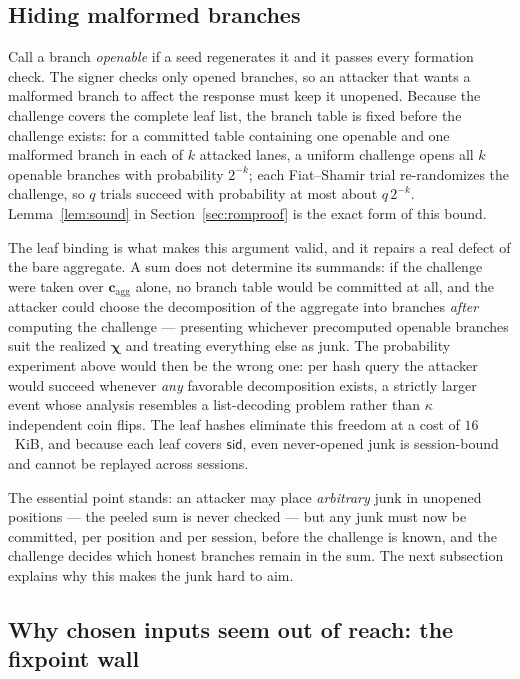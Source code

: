 \documentclass[11pt]{article}
\begin{document}
\subsection{Hiding malformed branches}
\label{sec:hiding}

Call a branch \emph{openable} if a seed regenerates it and it passes every
formation check.  The signer checks only opened branches, so an attacker that
wants a malformed branch to affect the response must keep it unopened.
Because the challenge covers the complete leaf list, the branch table is
fixed before the challenge exists: for a committed table containing one
openable and one malformed branch in each of $k$ attacked lanes, a uniform
challenge opens all $k$ openable branches with probability $2^{-k}$; each
Fiat--Shamir trial re-randomizes the challenge, so $q$ trials succeed with
probability at most about $q\,2^{-k}$.  Lemma~\ref{lem:sound} in
Section~\ref{sec:romproof} is the exact form of this bound.

The leaf binding is what makes this argument valid, and it repairs a real
defect of the bare aggregate.  A sum does not determine its summands: if the
challenge were taken over $\mathbf c_{\mathrm{agg}}$ alone, no branch table
would be committed at all, and the attacker could choose the decomposition of
the aggregate into branches \emph{after} computing the challenge ---
presenting whichever precomputed openable branches suit the realized
$\boldsymbol\chi$ and treating everything else as junk.  The probability
experiment above would then be the wrong one: per hash query the attacker
would succeed whenever \emph{any} favorable decomposition exists, a strictly
larger event whose analysis resembles a list-decoding problem rather than
$\kappa$ independent coin flips.  The leaf hashes eliminate this freedom at a
cost of $16$~KiB, and because each leaf covers $\mathsf{sid}$, even
never-opened junk is session-bound and cannot be replayed across sessions.

The essential point stands: an attacker may place
\emph{arbitrary} junk in unopened positions --- the peeled sum is never
checked --- but any junk must now be committed, per position and per session,
before the challenge is known, and the challenge decides which honest
branches remain in the sum.  The next subsection explains why this makes the
junk hard to aim.

\subsection{Why chosen inputs seem out of reach: the fixpoint wall}
\label{sec:fixpoint}
\end{document}
